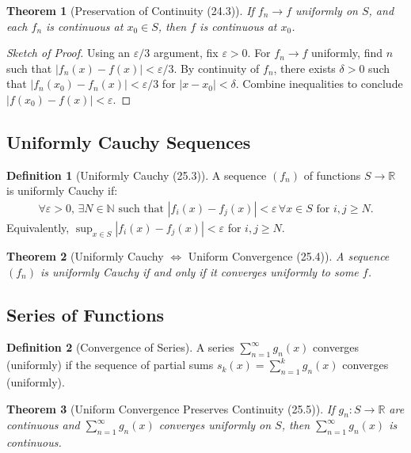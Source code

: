 \documentclass[9pt]{article}
\theoremstyle{definition}
\newtheorem{definition}{Definition}
\theoremstyle{plain}
\newtheorem{theorem}{Theorem}
\begin{document}
\begin{theorem}[Preservation of Continuity (24.3)]
If $ f_n \to f $ uniformly on $ S $, and each $ f_n $ is continuous at $ x_0 \in S $, then $ f $ is continuous at $ x_0 $.
\end{theorem}

\begin{proof}[Sketch of Proof]
Using an $ \varepsilon/3 $ argument, fix $ \varepsilon > 0 $. For $ f_n \to f $ uniformly, find $ n $ such that $ |f_n(x) - f(x)| < \varepsilon/3 $. By continuity of $ f_n $, there exists $ \delta > 0 $ such that $ |f_n(x_0) - f_n(x)| < \varepsilon/3 $ for $ |x - x_0| < \delta $. Combine inequalities to conclude $ |f(x_0) - f(x)| < \varepsilon $.
\end{proof}

\subsection*{Uniformly Cauchy Sequences}
\begin{definition}[Uniformly Cauchy (25.3)]
A sequence $ (f_n) $ of functions $ S \to \mathbb{R} $ is uniformly Cauchy if:
\begin{align}
\forall \varepsilon > 0, \, \exists N \in \mathbb{N} \text{ such that } |f_i(x) - f_j(x)| < \varepsilon \, \forall x \in S \text{ for } i, j \geq N.
\end{align}
Equivalently, $ \sup_{x \in S} |f_i(x) - f_j(x)| < \varepsilon $ for $ i, j \geq N $.
\end{definition}

\begin{theorem}[Uniformly Cauchy $ \iff $ Uniform Convergence (25.4)]
A sequence $ (f_n) $ is uniformly Cauchy if and only if it converges uniformly to some $ f $.
\end{theorem}

\subsection*{Series of Functions}
\begin{definition}[Convergence of Series]
A series $ \sum_{n=1}^\infty g_n(x) $ converges (uniformly) if the sequence of partial sums $ s_k(x) = \sum_{n=1}^k g_n(x) $ converges (uniformly).
\end{definition}

\begin{theorem}[Uniform Convergence Preserves Continuity (25.5)]
If $ g_n : S \to \mathbb{R} $ are continuous and $ \sum_{n=1}^\infty g_n(x) $ converges uniformly on $ S $, then $ \sum_{n=1}^\infty g_n(x) $ is continuous.
\end{theorem}
\end{document}
